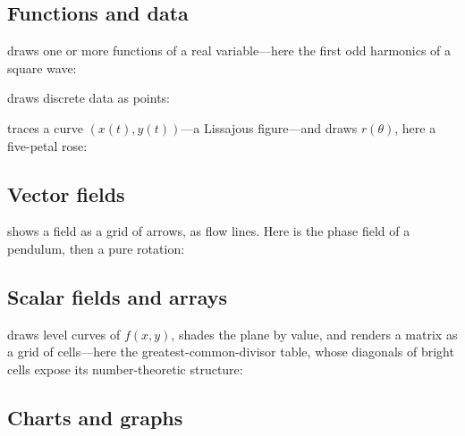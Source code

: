 \subsection{Functions and data}

 draws one or more functions of a real variable---here the first odd harmonics of
a square wave:


\noindent {} draws discrete data as points:


\noindent {} traces a curve $(x(t), y(t))$---a Lissajous figure---and
 draws $r(\theta)$, here a five-petal rose:



\subsection{Vector fields}

 shows a field as a grid of arrows,  as flow lines. Here is the
phase field of a pendulum, then a pure rotation:



\subsection{Scalar fields and arrays}

 draws level curves of $f(x,y)$,  shades the plane by value,
and  renders a matrix as a grid of cells---here the greatest-common-divisor
table, whose diagonals of bright cells expose its number-theoretic structure:




\subsection{Charts and graphs}

